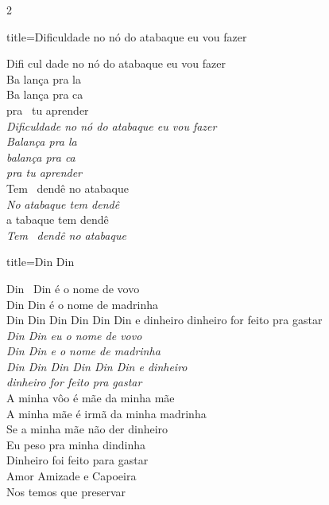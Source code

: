 \documentclass[fontsize=14pt, paper=a4, twoside, DIV=20]{scrreprt} %
\begin{document}
\begin{multicols*}{2}
\begin{song}{title={Dificuldade no nó do atabaque eu vou fazer}}
        \begin{verse*}
            Difi cul dade no nó do atabaque eu vou fazer\\
            Ba lança pra la\\
            Ba lança pra ca\\
            pra \ tu aprender\\
            \textit{Dificuldade no nó do atabaque eu vou fazer}\\
            \textit{Balança pra la}\\
            \textit{balança pra ca}\\
            \textit{pra tu aprender}\\
            Tem \ dendê no atabaque\\
            \textit{No} \textit{atabaque tem dendê}\\
            a tabaque tem dendê\\
            \textit{Tem} \ \textit{dendê no atabaque}\\
        \end{verse*}
\end{song}

\columnbreak
\begin{song}{title={Din Din}}
        \begin{verse*}
            Din \ Din é o nome de vovo\\
            Din Din é o nome de madrinha\\
            Din Din Din Din Din Din e dinheiro dinheiro for feito pra gastar\\
            \textit{Din Din eu o nome de vovo}\\
            \textit{Din Din e o nome de madrinha}\\
            \textit{Din Din Din Din Din Din e dinheiro}\\
            \textit{dinheiro for feito pra gastar}\\
            A minha vôo é mãe da minha mãe\\
            A minha mãe é irmã da minha madrinha\\
            Se a minha mãe não der dinheiro\\
            Eu peso pra minha dindinha\\
            Dinheiro foi feito para gastar\\
            Amor Amizade e Capoeira\\
            Nos temos que preservar\\
        \end{verse*}
\end{song}



\end{multicols*}
\end{document}
